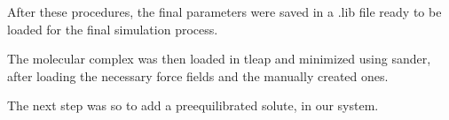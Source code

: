 \documentclass[12pt]{article}
\begin{document}
After these procedures, the final parameters were saved in a .lib file ready to be loaded for the final simulation process. 

The molecular complex was then loaded in tleap and minimized using sander, after loading the necessary force fields and the manually created ones. 

The next step was so to add a preequilibrated solute, in our system. 


\end{document}
